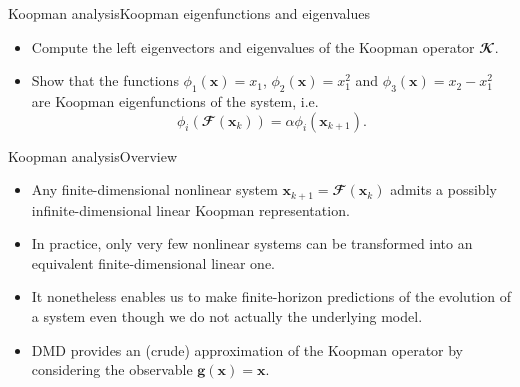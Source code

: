 \documentclass[usenames,dvipsnames,svgnames,10pt,aspectratio=169]{beamer}
\begin{document}
\begin{frame}[t, c]{Koopman analysis}{Koopman eigenfunctions and eigenvalues}
	\begin{itemize}
		\item Compute the left eigenvectors and eigenvalues of the Koopman operator $\mathbfcal{K}$.

		\bigskip

		\item Show that the functions $\phi_1(\mathbf{x}) = x_1$, $\phi_2(\mathbf{x}) = x_1^2$ and $\phi_3(\mathbf{x}) = x_2 - x_1^2$ are Koopman eigenfunctions of the system, i.e.\
		$$\phi_i \left( \mathbfcal{F} \left( \mathbf{x}_k \right) \right) = \alpha \phi_i \left( \mathbf{x}_{k+1} \right).$$
	\end{itemize}
\end{frame}

\begin{frame}[t, c]{Koopman analysis}{Overview}
	\begin{itemize}
		\item Any finite-dimensional nonlinear system $\mathbf{x}_{k+1} = \mathbfcal{F}\left( \mathbf{x}_k \right)$ admits a possibly infinite-dimensional linear Koopman representation.

		\bigskip

		\item In practice, only very few nonlinear systems can be transformed into an equivalent finite-dimensional linear one.

		\bigskip

		\item It nonetheless enables us to make finite-horizon predictions of the evolution of a system even though we do not actually the underlying model.

		\bigskip

		\item DMD provides an (crude) approximation of the Koopman operator by considering the observable $\bm{g}\left(\mathbf{x} \right) = \mathbf{x}$.
	\end{itemize}

	\vspace{1cm}
\end{frame}
\end{document}
